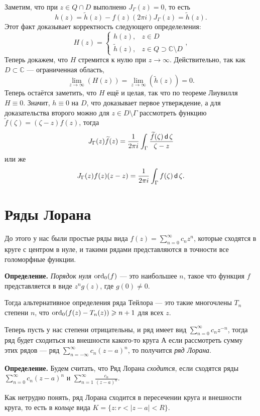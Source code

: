Заметим, что при $z \in Q \cap D$ выполнено $J_\Gamma(z) = 0$, то есть 
\[
    h(z) = \widetilde h(z) - f(z) (2\pi i) J_\Gamma(z) = \widetilde h(z).
\]
Этот факт доказывает корректность следующего определеления:
\[
    H(z) =
    \begin{cases}
        h(z), & z \in D \\
        \widetilde h(z), & z \in Q \supset \mathbb C \setminus D
    \end{cases},
\]
Теперь докажем, что $H$ стремится к нулю при $z \to \infty$.
Действительно, так как $D \subset \mathbb C$ --- ограниченная область, 
\[
    \lim_{z \to \infty}(H(z)) = \lim_{z \to \infty}(\widetilde h(z)) = 0.
\]
Теперь остаётся заметить, что $H$ ещё и целая, так что по теореме Лиувилля $H \equiv 0$.
Значит, $h \equiv 0$ на $D$, что доказывает первое утверждение, а для доказательства второго можно для $z \in D \setminus \Gamma$ рассмотреть функцию $\widetilde f(\zeta) = (\zeta - z) f(z)$, тогда
\[
    J_\Gamma(z) \widetilde f(z) = \frac{1}{2\pi i} \int_\Gamma \frac{\widetilde f(\zeta) \operatorname{\mathsf d} \zeta}{\zeta - z}
\]
или же
\[
    J_\Gamma(z) f(z) (z - z) = \frac{1}{2\pi i} \int_\Gamma f(\zeta) \operatorname{\mathsf d} \zeta.
\]

\QED

\section{Ряды Лорана}
До этого у нас были простые ряды вида $f(z) = \sum_{n=0}^{\infty} c_n z^n$, которые сходятся в круге с центром в нуле, и такими рядами представляются в точности все голоморфные функции.

\textbf{Определение.} \textit{Порядок нуля} $\operatorname{ord}_0(f)$ --- это наибольшее $n$, такое что функция $f$ представляется в виде $z^n g(z)$, где $g(0) \ne 0$.

Тогда альтернативное определения ряда Тейлора --- это такие многочлены $T_n$ степени $n$, что $\operatorname{ord}_0(f(z) - T_n(z)) \geqslant n + 1$ для всех $z$.

Теперь пусть у нас степени отрицательны, и ряд имеет вид $\sum_{n=0}^{\infty} c_n z^{-n}$, тогда ряд будет сходиться на внешности какого-то круга
А если рассмотреть сумму этих рядов --- ряд $\sum_{n=-\infty}^{\infty} c_n (z - a)^n$, то получится \textit{ряд Лорана}.

\textbf{Определение.} Будем считать, что Ряд Лорана \textit{сходится}, если сходятся ряды $\sum_{n=0}^{\infty} c_n (z - a)^n$ и $\sum_{n=1}^{\infty} \frac{c_n}{(z - a)^n}$.

Как нетрудно понять, ряд Лорана сходится в пересечении круга и внешности круга, то есть в \textit{кольце} вида $K = \{z: r < |z - a| < R\}$.

